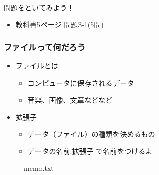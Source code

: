 \documentclass[slide03.tex]{subfiles}
\begin{document}
\begin{frame}
    \begin{exampleblock}{問題をといてみよう！}
        \begin{itemize}
            \item 教科書5ページ 問題3-1(5問)
        \end{itemize}
    \end{exampleblock}
\end{frame}

\begin{frame}
    \frametitle{ファイルって何だろう}
    \begin{itemize}
        \item ファイルとは
        \begin{itemize}
            \item コンピュータに保存されるデータ
            \item 音楽、画像、文章などなど
        \end{itemize}
        \item 拡張子
        \begin{itemize}
            \item データ（ファイル）の種類を決めるもの
            \item データの名前.拡張子 で名前をつけるよ
        \end{itemize}
    \end{itemize}

    \begin{figure}[h]
    \centering
    \begin{minipage}[b]{0.19\columnwidth}
        \centering
        
        \caption{oto.mp3}
    \end{minipage}
    \begin{minipage}[b]{0.19\columnwidth}
        \centering
        
        \caption{gazou.jpg}
    \end{minipage}
    \begin{minipage}[b]{0.19\columnwidth}
        \centering
        
        \caption{douga.mp4}
    \end{minipage}
    \begin{minipage}[b]{0.19\columnwidth}
        \centering
        
        \caption{image.png}
    \end{minipage}
    \begin{minipage}[b]{0.19\columnwidth}
        \centering
        
        \caption{memo.txt}
    \end{minipage}
    \end{figure}
\end{frame}
\end{document}

